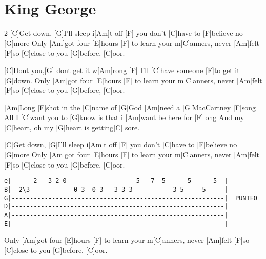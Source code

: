 \section{King George}
\begin{guitar}
\begin{multicols}{2}
[C]Get down, [G]I'll sleep i[Am]t off \hspace{1cm} [F]{ }
  you don't [C]have to [F]believe no [G]more
  Only [Am]got four [E]hours \hspace{1cm}[F]{}
  to learn your m[C]anners,
  never [Am]felt [F]so [C]close to you [G]before, [C]oor.

  
[C]Dont you,[G] dont get it w[Am]rong \hspace{1cm}[F]{}
  I'll [C]have someone [F]to get it [G]down.
  Only [Am]got four [E]hours \hspace{1cm}[F]{}
  to learn your m[C]anners,
  never [Am]felt [F]so [C]close to you [G]before, [C]oor.
  
  
  [Am]Long [F]shot in the [C]name of [G]God
  [Am]need a [G]MacCartney [F]song
  All I [C]want you to [G]know
  is that i [Am]want be here for [F]long
  And my [C]heart, oh my [G]heart is getting[C] sore.


[C]Get down, [G]I'll sleep i[Am]t off \hspace{1cm} [F]{ }
  you don't [C]have to [F]believe no [G]more
  Only [Am]got four [E]hours \hspace{1cm}[F]{}
  to learn your m[C]anners,
  never [Am]felt [F]so [C]close to you [G]before, [C]oor.
\end{multicols}
\begin{texttt}
\begin{verbatim}
e|------2---3-2-0-------------------5---7--5------5------5--|
B|--2\3------------0-3--0-3---3-3-3-----------3-5-----5-----|
G|----------------------------------------------------------|  PUNTEO
D|----------------------------------------------------------|
A|----------------------------------------------------------|
E|----------------------------------------------------------|
\end{verbatim}
\end{texttt}
  Only [Am]got four [E]hours \hspace{1cm}[F]{}
  to learn your m[C]anners,
  never [Am]felt [F]so [C]close to you [G]before, [C]oor.


\end{guitar}
